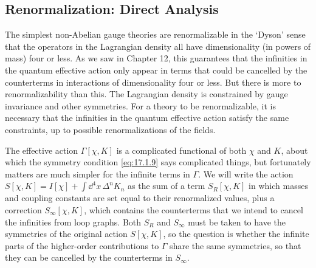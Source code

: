 \subsection{Renormalization: Direct Analysis}

The simplest non-Abelian gauge theories are renormalizable in the `Dyson' sense that the operators in the Lagrangian density all have dimensionality (in powers of mass) four or less. As we saw in Chapter 12, this guarantees that the infinities in the quantum effective action only appear in terms that could be cancelled by the counterterms in interactions of dimensionality four or less. But there is more to renormalizability than this. The Lagrangian density is constrained by gauge invariance and other symmetries. For a theory to be renormalizable, it is necessary that the infinities in the quantum effective action satisfy the same constraints, up to possible renormalizations of the fields.

The effective action $\Gamma[\chi,K]$ is a complicated functional of both $\chi$ and $K$, about which the symmetry condition \eqref{eq:17.1.9} says complicated things, but fortunately matters are much simpler for the infinite terms in $\Gamma$. We will write the action $S[\chi,K]=I[\chi]+\int \dd^4x\,\Delta^nK_n$ as the sum of a term $S_R[\chi,K]$ in which masses and coupling constants are set equal to their renormalized values, plus a correction $S_\infty[\chi,K]$, which contains the counterterms that we intend to cancel the infinities from loop graphs. Both $S_R$ and $S_\infty$ must be taken to have the symmetries of the original action $S[\chi,K]$, so the question is whether the infinite parts of the higher-order contributions to $\Gamma$ share the same symmetries, so that they can be cancelled by the counterterms in $S_\infty$.

